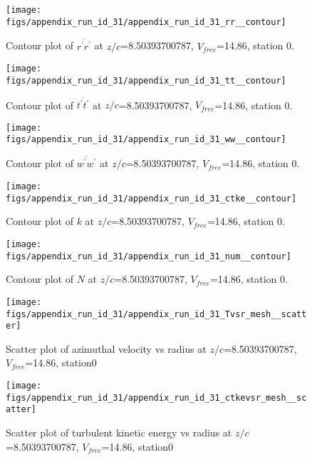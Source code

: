 \begin{figure}[H]
\centering
\texttt{[image: figs/appendix\_run\_id\_31/appendix\_run\_id\_31\_rr\_\_contour]}
\caption{Contour plot of $\overline{r^\prime r^\prime}$ at $z/c$=8.50393700787, $V_{free}$=14.86, station 0.}
\label{fig:appendix_run_id_31_rr__contour}
\end{figure}


\begin{figure}[H]
\centering
\texttt{[image: figs/appendix\_run\_id\_31/appendix\_run\_id\_31\_tt\_\_contour]}
\caption{Contour plot of $\overline{t^\prime t^\prime}$ at $z/c$=8.50393700787, $V_{free}$=14.86, station 0.}
\label{fig:appendix_run_id_31_tt__contour}
\end{figure}


\begin{figure}[H]
\centering
\texttt{[image: figs/appendix\_run\_id\_31/appendix\_run\_id\_31\_ww\_\_contour]}
\caption{Contour plot of $\overline{w^\prime w^\prime}$ at $z/c$=8.50393700787, $V_{free}$=14.86, station 0.}
\label{fig:appendix_run_id_31_ww__contour}
\end{figure}


\begin{figure}[H]
\centering
\texttt{[image: figs/appendix\_run\_id\_31/appendix\_run\_id\_31\_ctke\_\_contour]}
\caption{Contour plot of $k$ at $z/c$=8.50393700787, $V_{free}$=14.86, station 0.}
\label{fig:appendix_run_id_31_ctke__contour}
\end{figure}


\begin{figure}[H]
\centering
\texttt{[image: figs/appendix\_run\_id\_31/appendix\_run\_id\_31\_num\_\_contour]}
\caption{Contour plot of $N$ at $z/c$=8.50393700787, $V_{free}$=14.86, station 0.}
\label{fig:appendix_run_id_31_num__contour}
\end{figure}


\begin{figure}[H]
\centering
\texttt{[image: figs/appendix\_run\_id\_31/appendix\_run\_id\_31\_Tvsr\_mesh\_\_scatter]}
\caption{Scatter plot of azimuthal velocity vs radius at $z/c$=8.50393700787, $V_{free}$=14.86, station0}
\label{fig:appendix_run_id_31_Tvsr_mesh__scatter}
\end{figure}


\begin{figure}[H]
\centering
\texttt{[image: figs/appendix\_run\_id\_31/appendix\_run\_id\_31\_ctkevsr\_mesh\_\_scatter]}
\caption{Scatter plot of turbulent kinetic energy vs radius at $z/c$=8.50393700787, $V_{free}$=14.86, station0}
\label{fig:appendix_run_id_31_ctkevsr_mesh__scatter}
\end{figure}


